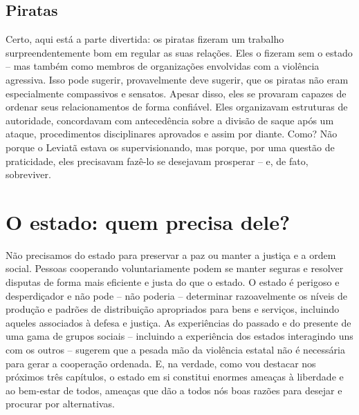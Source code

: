 \subsection*{Piratas}

Certo, aqui está a parte divertida: os piratas fizeram um trabalho surpreendentemente bom em regular as suas relações. Eles o fizeram sem o estado -- mas também como membros de organizações envolvidas com a violência agressiva. Isso pode sugerir, provavelmente deve sugerir, que os piratas não eram especialmente compassivos e sensatos. Apesar disso, eles se provaram capazes de ordenar seus relacionamentos de forma confiável. Eles organizavam estruturas de autoridade, concordavam com antecedência sobre a divisão de saque após um ataque, procedimentos disciplinares aprovados e assim por diante. Como? Não porque o Leviatã estava os supervisionando, mas porque, por uma questão de praticidade, eles precisavam fazê-lo se desejavam prosperar -- e, de fato, sobreviver.

\section{O estado: quem precisa dele?}

Não precisamos do estado para preservar a paz ou manter a justiça e a ordem social. Pessoas cooperando voluntariamente podem se manter seguras e resolver disputas de forma mais eficiente e justa do que o estado. O estado é perigoso e desperdiçador e não pode -- não poderia -- determinar razoavelmente os níveis de produção e padrões de distribuição apropriados para bens e serviços, incluindo aqueles associados à defesa e justiça. As experiências do passado e do presente de uma gama de grupos sociais -- incluindo a experiência dos estados interagindo uns com os outros -- sugerem que a pesada mão da violência estatal não é necessária para gerar a cooperação ordenada. E, na verdade, como vou destacar nos próximos três capítulos, o estado em si constitui enormes ameaças à liberdade e ao bem-estar de todos, ameaças que dão a todos nós boas razões para desejar e procurar por alternativas.